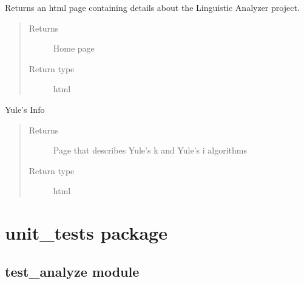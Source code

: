 \documentclass[letterpaper,10pt,english]{sphinxmanual}
\begin{document}

\begin{fulllineitems}
\label{\detokenize{app:app.project}}
Returns an html page containing details about the Linguistic Analyzer project.
\begin{quote}\begin{description}
\item[{Returns}] \leavevmode
Home page

\item[{Return type}] \leavevmode
html

\end{description}\end{quote}

\end{fulllineitems}


\begin{fulllineitems}
\label{\detokenize{app:app.yulesinfo}}
Yule’s Info
\begin{quote}\begin{description}
\item[{Returns}] \leavevmode
Page that describes Yule’s k and Yule’s i algorithms

\item[{Return type}] \leavevmode
html

\end{description}\end{quote}

\end{fulllineitems}



\chapter{unit\_tests package}
\label{\detokenize{unit_tests::doc}}\label{\detokenize{unit_tests:unit-tests-package}}

\section{test\_analyze module}
\label{\detokenize{unit_tests:module-unit_tests.test_analyze}}\label{\detokenize{unit_tests:test-analyze-module}}
\end{document}
